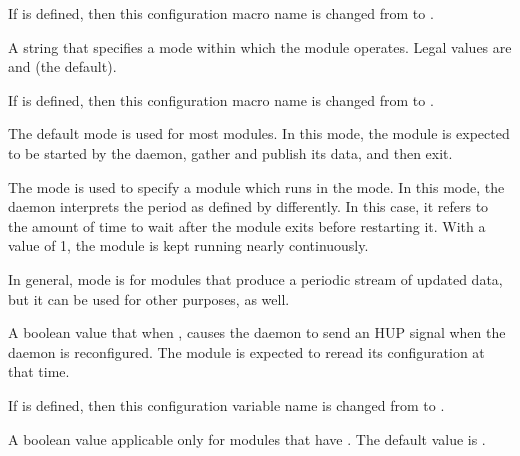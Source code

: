 \begin{description}
  If 
  is defined, then this configuration macro name is changed from
   to
  .


\label{param:StartdCronModuleMode}
\item[\Macro{STARTD\_CRON\_<ModuleName>\_MODE}]
  A string that specifies a mode within which the module operates.
  Legal values are  and  (the
  default).  

  If 
  is defined, then this configuration macro name is changed from
   to
  .

  The default  mode is used for most modules.  In
  this mode, the module is expected to be started by the
   daemon, gather and publish its data, and then
  exit.

  The  mode is used to specify a module
  which runs in the  mode.
  In this mode, the  daemon interprets the period as defined by 
   differently.
  In this case, it refers to the amount of time to wait after the module exits
  before restarting it.  With a value of 1, the module is kept
  running nearly continuously.

  In general,  mode is for modules that produce
  a periodic stream of updated data, but it can be used for other
  purposes, as well.

\label{param:StartdCronModuleReconfig}
\item[\Macro{STARTD\_CRON\_<ModuleName>\_RECONFIG}]
  A boolean value that when , causes the 
  daemon to send an HUP signal when the  daemon is reconfigured.
  The module is expected to reread its configuration at that time.

  If 
  is defined, then this configuration variable name is changed from
   to
  .

\label{param:StartdCronModuleKill}
\item[\Macro{STARTD\_CRON\_<ModuleName>\_KILL}]
  A boolean value applicable only for modules that have
  .
  The default value is .


\end{description}
